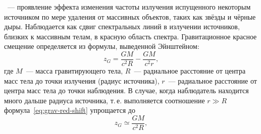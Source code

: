 ~--- проявление эффекта изменения частоты излучения испущенного некоторым источником по мере удаления от массивных объектов, таких как звёзды и чёрные дыры. Наблюдается как сдвиг спектральных линий в излучении источников, близких к массивным телам, в красную область спектра. Гравитационное красное смещение определяется из формулы, выведенной Эйнштейном:
\begin{equation}
z_G=\frac{GM}{c^2 R}-\frac{GM}{c^2 r},
\label{eq:grav-red-shift}
\end{equation}
где $M$~--- масса гравитирующего тела, $R$~--- радиальное расстояние от центра масс тела до точки излучения (радиус источника), $r$~---  радиальное расстояние от центра масс тела до точки наблюдения. В случае, когда наблюдатель находится много дальше радиуса источника, т.\,е. выполняется соотношение $r \gg R$ формула~\eqref{eq:grav-red-shift} упрощается до \begin{equation}
	z_G \simeq \frac{GM}{c^2 R},
\end{equation}
